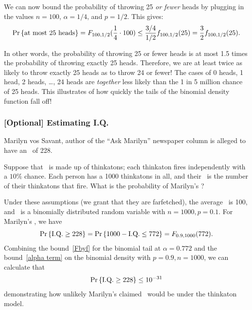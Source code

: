 \documentclass[11pt,twoside]{article}
\makeatletter
\newcommand{\IQ}{\text{I.Q.\@\xspace}}
\makeatother
\begin{document}
We can now bound the probability of throwing 25 \emph{or fewer} heads by
plugging in the values $n = 100$, $\alpha = 1/4$, and $p = 1/2$.  This
gives:
\begin{equation*}
\mathop{\textup{Pr}}\nolimits\left\{\mbox{at most 25 heads}\right\}
   = F_{100, 1/2}(\frac{1}{4} \cdot 100)
   \leq \frac{3/4}{1/2} f_{100, 1/2}(25)
   = \frac{3}{2}  f_{100, 1/2}(25).
\end{equation*}

In other words, the probability of throwing 25 or fewer heads is at most
1.5 times the probability of throwing exactly 25 heads.  Therefore, we are
at least twice as likely to throw exactly 25 heads as to throw 24 or fewer!
The cases of 0 heads, 1 head, 2 heads, \dots, 24 heads are \emph{together}
less likely than the 1 in 5 million chance of 25 heads.  This illustrates
of how quickly the tails of the binomial density function fall off!

\subsubsection{[Optional] Estimating I.Q.}
\begin{optional}

Marilyn vos Savant, author of the ``Ask Marilyn'' newspaper column is
alleged to have an \IQ\ of 228.

Suppose that \IQ\ is made up of thinkatons; each thinkaton fires
independently with a $10\%$ chance.  Each person has a 1000 thinkatons in
all, and their \IQ\ is the number of their thinkatons that fire.
What is the probability of Marilyn's \IQ?

Under these assumptions (we grant that they are farfetched), the average
\IQ\ is 100, and \IQ\ is a binomially distributed random variable with
$n=1000, p= 0.1$.  For Marilyn's \IQ, we have
\[
\pr{\IQ \geq 228} = \pr{1000-\IQ \leq 772} = F_{0.9,1000}(772).
\]
Combining the bound~\eqref{Fbyf} for the binomial tail at $\alpha = 0.772$
and the bound~\eqref{alpha term} on the binomial density with $p = 0.9, n =
1000$, we can calculate that
\[
\pr{\IQ \geq 228} \leq 10^{-31} %
\]
demonstrating how unlikely Marilyn's claimed \IQ\ would be under the
thinkaton model.

\end{optional}
\end{document}

